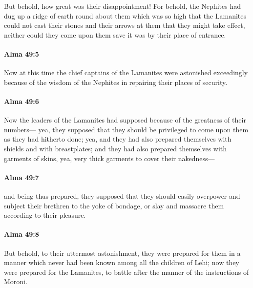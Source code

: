 			But behold, how great was their disappointment!
			For behold, the Nephites had dug up a ridge of earth round about them
			which was so high that the Lamanites could not cast
			their stones and their arrows at them that they might take effect,
			neither could they come upon them
			save it was by their place of entrance.

		\paragraph{Alma 49:5} %
			\label{ALMA-49-5}

			Now at this time the chief captains of the Lamanites were astonished exceedingly
			because of the wisdom of the Nephites in repairing their places of security.

		\paragraph{Alma 49:6} %
			\label{ALMA-49-6}

			Now the leaders of the Lamanites had supposed
			because of the greatness of their numbers---
			yea, they supposed that they should be privileged
			to come upon them as they had hitherto done;
			yea, and they had also prepared themselves with shields and with breastplates;
			and they had also prepared themselves with garments of skins,
			yea, very thick garments to cover their nakedness---

		\paragraph{Alma 49:7} %
			\label{ALMA-49-7}

			and being thus prepared,
			they supposed that they should easily overpower
			and subject their brethren to the yoke of bondage,
			or slay and massacre them according to their pleasure.

		\paragraph{Alma 49:8} %
			\label{ALMA-49-8}

			But behold, to their uttermost astonishment,
			they were prepared for them in a manner
			which never had been known among all the children of Lehi;
			now they were prepared for the Lamanites,
			to battle after the manner of the instructions of Moroni.

